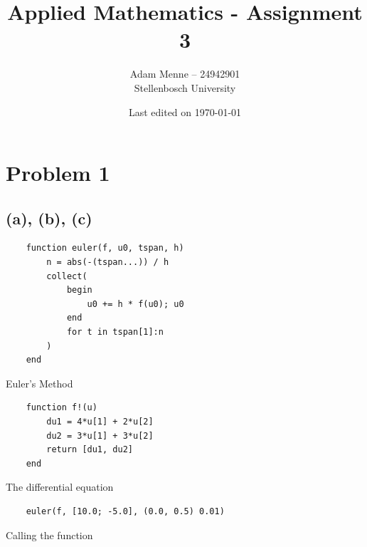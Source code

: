 \documentclass[a4paper, british]{article}
\title{Applied Mathematics - Assignment 3}
\date{Last edited on \today}
\author{Adam Menne -- 24942901\\ Stellenbosch University}
\begin{document}
\maketitle

\vspace{40mm}

\tableofcontents

\newpage

\section{Problem 1}


\subsection*{(a), (b), (c)}

\begin{listing}[H]
    \begin{verbatim}
    function euler(f, u0, tspan, h)
        n = abs(-(tspan...)) / h
        collect(
            begin
                u0 += h * f(u0); u0
            end
            for t in tspan[1]:n
        )
    end   
    \end{verbatim}
    \caption{Euler's Method}
    \label{lst:euler}
\end{listing}

\begin{listing}[H]
    \begin{verbatim}
    function f!(u)
        du1 = 4*u[1] + 2*u[2]
        du2 = 3*u[1] + 3*u[2]
        return [du1, du2]
    end
    \end{verbatim}
    \caption{The differential equation}
    \label{lst:dif_func}
\end{listing}

\begin{listing}[H]
    \begin{verbatim}
    euler(f, [10.0; -5.0], (0.0, 0.5) 0.01)
    \end{verbatim}
    \caption{Calling the function}
    \label{lst:func_call}
\end{listing}
\end{document}
